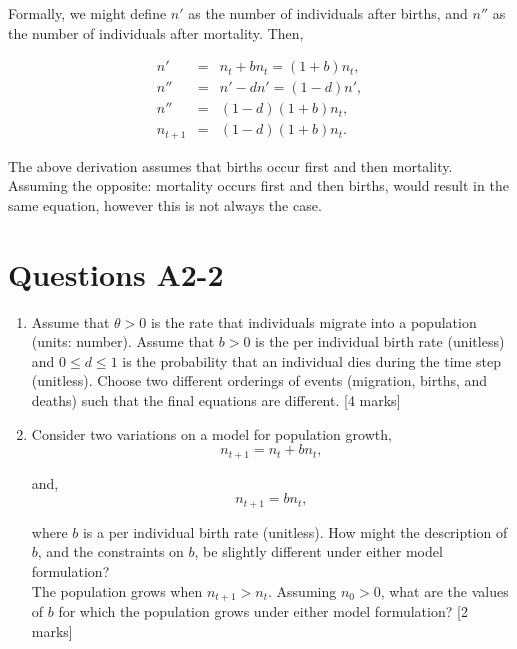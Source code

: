 \documentclass[]{book}
\begin{document}
Formally, we might define \(n'\) as the number of individuals after
births, and \(n''\) as the number of individuals after mortality. Then,

\begin{eqnarray}
n' &=& n_t + bn_t = (1+b)n_t, \\
n'' &=& n' - dn' = (1-d)n', \\
n'' &=& (1-d)(1+b)n_t, \\
n_{t+1} &=& (1-d)(1+b)n_t.
\end{eqnarray}

The above derivation assumes that births occur first and then mortality.
Assuming the opposite: mortality occurs first and then births, would
result in the same equation, however this is not always the case.

\section{Questions A2-2}\label{questions-a2-2}

\begin{enumerate}
\def\labelenumi{\arabic{enumi}.}
\setcounter{enumi}{2}
\item
  Assume that \(\theta > 0\) is the rate that individuals migrate into a
  population (units: number). Assume that \(b>0\) is the per individual
  birth rate (unitless) and \(0 \leq d \leq 1\) is the probability that
  an individual dies during the time step (unitless). Choose two
  different orderings of events (migration, births, and deaths) such
  that the final equations are different. {[}4 marks{]}
\item
  Consider two variations on a model for population growth,\\

  \begin{equation}
  n_{t+1} = n_t + bn_t,
  \label{eq:BD1}
  \end{equation}

  and,\\

  \begin{equation}
  n_{t+1} = bn_t,
  \label{eq:BD2}
  \end{equation}

  where \(b\) is a per individual birth rate (unitless). How might the
  description of \(b\), and the constraints on \(b\), be slightly
  different under either model formulation?\\[2\baselineskip]The
  population grows when \(n_{t+1}>n_t\). Assuming \(n_0 >0\), what are
  the values of \(b\) for which the population grows under either model
  formulation? {[}2 marks{]}
\end{enumerate}
\end{document}
